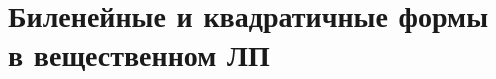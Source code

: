 \documentclass[../main.tex]{subfiles}
\begin{document}
\chapter{Биленейные и квадратичные формы в вещественном ЛП} 

\end{document}
